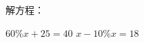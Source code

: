 解方程：
\begin{subquestions}
\subquestion $60\% x + 25 = 40$
\subquestion $x - 10\% x = 18$


\end{subquestions}